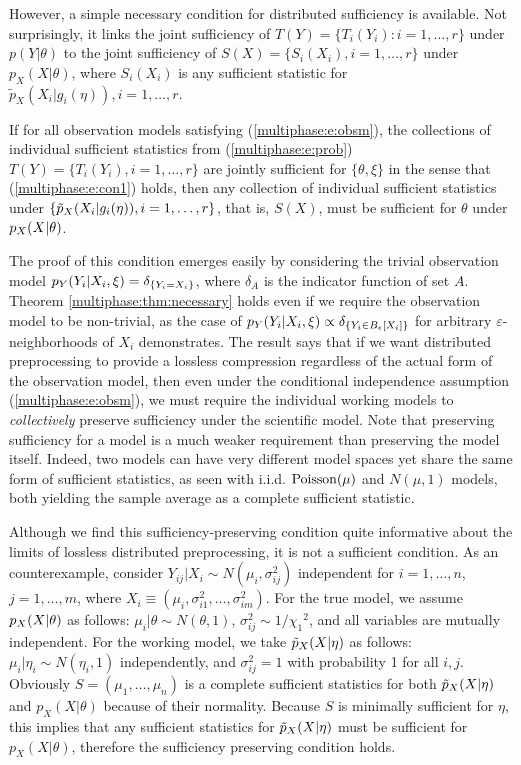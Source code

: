 However, a simple necessary condition for distributed sufficiency is available.
Not surprisingly, it links the joint sufficiency of $T(Y)=\{T_i(Y_i): i=1,\ldots, r\}$ under $p(Y|\theta)$ to the joint sufficiency of $S(X)=\{S_i(X_i), i=1,\ldots,r\}$ under $p_X(X|\theta)$, where $S_i(X_i)$ is any sufficient statistic for $\tilde p_X(X_{i}|g_i(\eta)), i=1,\ldots, r$.
%
\begin{theorem}
\label{multiphase:thm:necessary}
If for all observation models satisfying (\ref{multiphase:e:obsm}), the collections of individual sufficient statistics from (\ref{multiphase:e:prob}) $T(Y)=\{T_i(Y_i), i=1,\ldots, r\}$ are jointly sufficient for $\{\theta,\xi\}$ in the sense that  (\ref{multiphase:e:con1}) holds, then any collection of individual sufficient statistics under $\{\tilde{p}_X(X_i | g_i(\eta)), i=1,\ldots, r\}$, that is, $S(X)$, must be sufficient for $\theta$ under $p_X(X | \theta)$.
\end{theorem}
%
The proof of this condition emerges easily by considering the trivial observation model $p_Y(Y_i | X_i, \xi) = \delta_{\{Y_i = X_i\}}$, where $\delta_{A}$ is the indicator function of set $A$.
Theorem \ref{multiphase:thm:necessary} holds even if we require the observation model to be non-trivial, as the case of $p_Y(Y_i | X_i, \xi) \propto \delta_{\{Y_i \in B_{\epsilon}[X_i]\}}$ for arbitrary $\varepsilon$-neighborhoods of $X_i$ demonstrates.
The result says that if we want distributed preprocessing to provide a lossless compression regardless of the actual form of the observation model, then even under the conditional independence assumption (\ref{multiphase:e:obsm}), we must require the individual working models to  \textit{collectively} preserve sufficiency under the scientific model.
 Note that preserving sufficiency for a model is a much weaker requirement than preserving the model itself.
Indeed, two models can have very different model spaces yet share the same form of sufficient statistics, as seen with i.i.d.
$\operatorname{Poisson}(\mu)$ and $N(\mu, 1)$ models, both yielding the sample average as a complete sufficient statistic.

Although we find this sufficiency-preserving condition quite informative about the limits of lossless distributed preprocessing, it is not a sufficient condition.
As an counterexample, consider  $Y_{ij} | X_i \sim N(\mu_i, \sigma_{ij}^2 )$ independent for $i=1,\ldots,n$, $j=1,\ldots,m$, where $X_i \equiv (\mu_i, \sigma_{i1}^2, \ldots, \sigma_{im}^2)$.
For the true model, we assume $p_X(X|\theta)$ as
follows: $\mu_i | \theta \sim N(\theta, 1)$, $\sigma_{ij}^2 \sim 1/{\chi_1}^2$, and all variables are mutually  independent.
For the working model, we take $\tilde{p}_X(X|\eta)$ as
follows: $\mu_i | \eta_i \sim N(\eta_i, 1)$ independently, and $\sigma_{ij}^2 = 1$ with probability 1 for all $i,j$.
%
Obviously $S=(\mu_1, \ldots, \mu_n)$ is a complete sufficient statistics for both $\tilde{p}_X(X|\eta)$ and $p_X(X|\theta)$ because of their normality. Because $S$ is minimally sufficient for $\eta$, this implies that any sufficient statistics for $\tilde{p}_X(X|\eta)$ must be sufficient for $p_X(X|\theta)$, therefore the sufficiency preserving condition holds.

